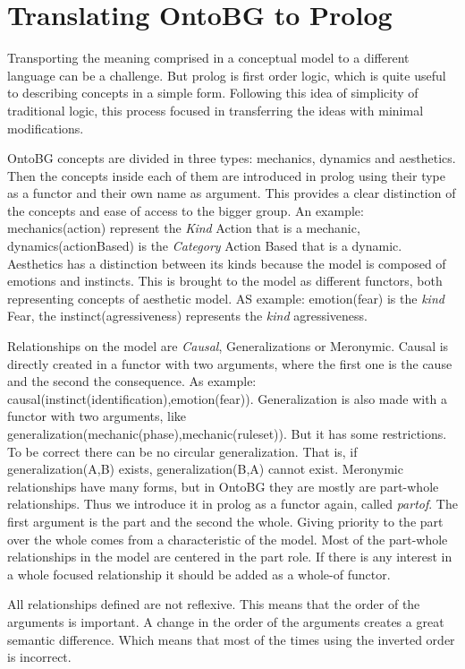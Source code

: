 \section{Translating OntoBG to Prolog}

Transporting the meaning comprised in a conceptual model to a different language can be a challenge. But prolog is first order logic, which is quite useful to describing concepts in a simple form. Following this idea of simplicity of traditional logic, this process focused in transferring the ideas with minimal modifications.

OntoBG concepts are divided in three types: mechanics, dynamics and aesthetics. Then the concepts inside each of them are introduced in prolog using their type as a functor and their own name as argument. This provides a clear distinction of the concepts and ease of access to the bigger group. An example: mechanics(action) represent the \textit{Kind} Action that is a mechanic, dynamics(actionBased) is the \textit{Category} Action Based that is a dynamic. Aesthetics has a distinction between its kinds because the model is composed of emotions and instincts. This is brought to the model as different functors, both representing concepts of aesthetic model. AS example: emotion(fear) is the \textit{kind} Fear, the instinct(agressiveness) represents the \textit{kind} agressiveness. 

Relationships on the model are \textit{Causal}, Generalizations or Meronymic. Causal is directly created in a functor with two arguments, where the first one is the cause and the second the consequence. As  example: causal(instinct(identification),emotion(fear)). Generalization is also made with a functor with two arguments, like generalization(mechanic(phase),mechanic(ruleset)). But it has some restrictions. To be correct there can be no circular generalization. That is, if generalization(A,B) exists, generalization(B,A) cannot exist. Meronymic relationships have many forms, but in OntoBG they are mostly are part-whole relationships. Thus we introduce it in prolog as a functor again, called \textit{partof}. The first argument is the part and the second the whole. Giving priority to the part over the whole comes from a characteristic of the model. Most of the part-whole relationships in the model are centered in the part role. If there is any interest in a whole focused relationship it should be added as a whole-of functor. 

All relationships defined are not reflexive. This means that the order of the arguments is important. A change in the order of the arguments creates a great semantic difference. Which means that most of the times using the inverted order is incorrect. 

